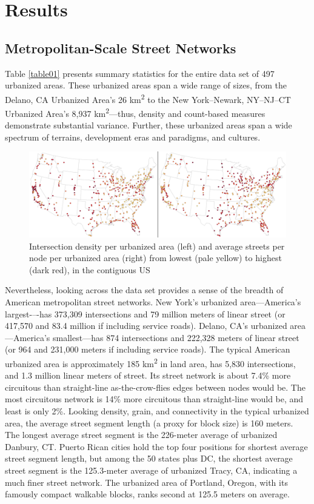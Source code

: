 \documentclass{article}
\begin{document}
\section{Results}

\subsection{Metropolitan-Scale Street Networks}

Table \ref{table01} presents summary statistics for the entire data set of 497 urbanized areas. These urbanized areas span a wide range of sizes, from the Delano, CA Urbanized Area's 26 km\textsuperscript{2} to the New York--Newark, NY--NJ--CT Urbanized Area's 8,937 km\textsuperscript{2}---thus, density and count-based measures demonstrate substantial variance. Further, these urbanized areas span a wide spectrum of terrains, development eras and paradigms, and cultures.

\begin{figure}
\includegraphics[width=1\textwidth]{media/fig01.png}
\caption{Intersection density per urbanized area (left) and average streets per node per urbanized area (right) from lowest (pale yellow) to highest (dark red), in the contiguous US}
\label{fig01}
\end{figure}

Nevertheless, looking across the data set provides a sense of the breadth of American metropolitan street networks. New York's urbanized area---America's largest-–-has 373,309 intersections and 79 million meters of linear street (or 417,570 and 83.4 million if including service roads). Delano, CA's urbanized area---America's smallest---has 874 intersections and 222,328 meters of linear street (or 964 and 231,000 meters if including service roads). The typical American urbanized area is approximately 185 km\textsuperscript{2} in land area, has 5,830 intersections, and 1.3 million linear meters of street. Its street network is about 7.4\% more circuitous than straight-line as-the-crow-flies edges between nodes would be. The most circuitous network is 14\% more circuitous than straight-line would be, and least is only 2\%. Looking density, grain, and connectivity in the typical urbanized area, the average street segment length (a proxy for block size) is 160 meters. The longest average street segment is the 226-meter average of urbanized Danbury, CT. Puerto Rican cities hold the top four positions for shortest average street segment length, but among the 50 states plus DC, the shortest average street segment is the 125.3-meter average of urbanized Tracy, CA, indicating a much finer street network. The urbanized area of Portland, Oregon, with its famously compact walkable blocks, ranks second at 125.5 meters on average.
\end{document}
